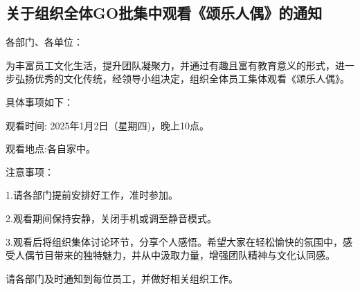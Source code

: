 \documentclass[letterpaper, 12pt]{article}
\begin{document}
\begin{multicols}{2}
\section{关于组织全体GO批集中观看《颂乐人偶》的通知}
各部门、各单位：

为丰富员工文化生活，提升团队凝聚力，并通过有趣且富有教育意义的形式，进一步弘扬优秀的文化传统，经领导小组决定，组织全体员工集体观看《颂乐人偶》。

具体事项如下：

观看时间: 2025年1月2日（星期四)，晚上10点。

观看地点:各自家中。

注意事项：

1.请各部门提前安排好工作，准时参加。

2.观看期间保持安静，关闭手机或调至静音模式。

3.观看后将组织集体讨论环节，分享个人感悟。希望大家在轻松愉快的氛围中，感受人偶节目带来的独特魅力，并从中汲取力量，增强团队精神与文化认同感。

请各部门及时通知到每位员工，并做好相关组织工作。
\end{multicols} 
\end{document}
